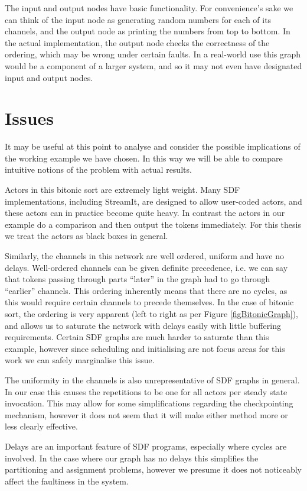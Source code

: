 The input and output nodes have basic functionality.
For convenience's sake we can think of the input node as generating random numbers for each of its channels, and the output node as printing the numbers from top to bottom.
In the actual implementation, the output node checks the correctness of the ordering, which may be wrong under certain faults.
In a real-world use this graph would be a component of a larger system, and so it may not even have designated input and output nodes.

\section{Issues}

It may be useful at this point to analyse and consider the possible implications of the working example we have chosen.
In this way we will be able to compare intuitive notions of the problem with actual results.

Actors in this bitonic sort are extremely light weight.
Many SDF implementations, including StreamIt, are designed to allow user-coded actors, and these actors can in practice become quite heavy.
In contrast the actors in our example do a comparison and then output the tokens immediately.
For this thesis we treat the actors as black boxes in general.

Similarly, the channels in this network are well ordered, uniform and have no delays.
Well-ordered channels can be given definite precedence, i.e. we can say that tokens passing through parts ``later'' in the graph had to go through ``earlier'' channels.
This ordering inherently means that there are no cycles, as this would require certain channels to precede themselves.
In the case of bitonic sort, the ordering is very apparent (left to right as per Figure \ref{figBitonicGraph}), and allows us to saturate the network with delays easily with little buffering requirements.
Certain SDF graphs are much harder to saturate than this example, however since scheduling and initialising are not focus areas for this work we can safely marginalise this issue.

The uniformity in the channels is also unrepresentative of SDF graphs in general.
In our case this causes the repetitions to be one for all actors per steady state invocation.
This may allow for some simplifications regarding the checkpointing mechanism, however it does not seem that it will make either method more or less clearly effective.

Delays are an important feature of SDF programs, especially where cycles are involved.
In the case where our graph has no delays this simplifies the partitioning and assignment problems, however we presume it does not noticeably affect the faultiness in the system.

